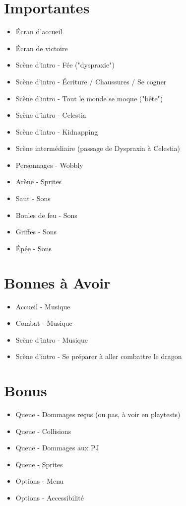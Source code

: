 \documentclass{scrartcl}
\begin{document}
	\section{Importantes}
	\begin{itemize}
		\item Écran d'accueil
		\item Écran de victoire
		\item Scène d'intro - Fée ("dyspraxie")
		\item Scène d'intro - Écriture / Chaussures / Se cogner 
		\item Scène d'intro - Tout le monde se moque ("bête")
		\item Scène d'intro - Celestia 
		\item Scène d'intro - Kidnapping
		\item Scène intermédiaire (passage de Dyspraxia à Celestia)
		\item Personnages - Wobbly 
		\item Arène - Sprites
		\item Saut - Sons
		\item Boules de feu - Sons
		\item Griffes - Sons
		\item Épée - Sons
	\end{itemize}
	\section{Bonnes à Avoir}
	\begin{itemize}
	\item Accueil - Musique
	\item Combat - Musique
	\item Scène d'intro - Musique
	\item Scène d'intro - Se préparer à aller combattre le dragon
	\end{itemize}
	\section{Bonus}
	\begin{itemize}
		\item Queue - Dommages reçus (ou pas, à voir en playtests)
		\item Queue - Collisions
		\item Queue - Dommages aux PJ 
		\item Queue - Sprites
		\item Options - Menu
		\item Options - Accessibilité
	\end{itemize}
	
\end{document}
